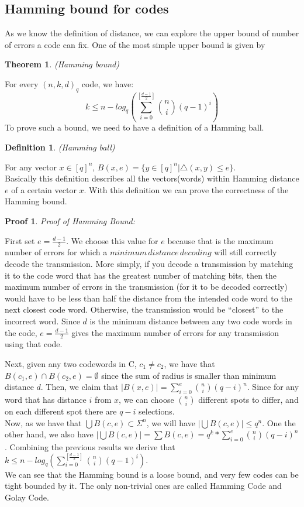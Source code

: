 \documentclass{article}
\newtheorem{Definition}{Definition}
\newtheorem{Theorem}{Theorem}
\newtheorem{Proof}{Proof}
\begin{document}
\subsection{Hamming bound for codes}
As we know the definition of distance, we can explore the upper bound of number of errors a code can fix. One of the most simple upper bound is given by
\begin{Theorem}(Hamming bound)\end{Theorem}
\noindent For every $(n,k,d)_{q}$ code, we have:
\begin{equation}
k \le n - log_q(\sum_{i=0}^{[\frac{d-1}{2}]}{n \choose i} (q-1)^i)
\end{equation}
To prove such a bound, we need to have a definition of a Hamming ball.
\begin{Definition}(Hamming ball)\end{Definition}
\noindent For any vector $x \in [q]^n$,
$B(x,e) = \{y \in [q]^n | \bigtriangleup (x,y) \le e\}$.\\
Basically this definition describes all the vectors(words) within Hamming distance $e$ of a certain vector $x$. With this definition we can prove the correctness of the Hamming bound.
\begin{Proof}Proof of Hamming Bound: \end{Proof} 
\noindent First set $e = \frac{d-1}{2}$. We choose this value for $e$ because that is the maximum number of errors for which a $minimum\, distance\, decoding$ will still correctly decode the transmission. More simply, if you decode a transmission by matching it to the code word that has the greatest number of matching bits, then the maximum number of errors in the transmission (for it to be decoded correctly) would have to be less than half the distance from the intended code word to the next closest code word. Otherwise, the transmission would be ``closest'' to the incorrect word. Since $d$ is the minimum distance between any two code words in the code,  $e = \frac{d-1}{2}$ gives the maximum number of errors for any transmission using that code. 

 Next, given any two codewords in C, $c_1 \neq c_2$, we have that $B(c_1,e) \cap B(c_2,e) = \emptyset$ since the sum of radius is smaller than minimum distance $d$. Then, we claim that $|B(x,e)| = \sum_{i=0}^{e} {n \choose i}(q-i)^n$. Since for any word that has distance $i$ from $x$, we can choose ${n \choose i}$ different spots to differ, and on each different spot there are $q-i$ selections.\\
Now, as we have that $\bigcup B(c,e) \subset \Sigma^n$, we will have $|\bigcup B(c,e)| \le q^n$. One the other hand, we also have $|\bigcup B(c,e)| = \sum B(c,e) = q^k* \sum_{i=0}^{e} {n \choose i}(q-i)^n$. Combining the previous results we derive that $k \le n - log_q(\sum_{i=0}^{[\frac{d-1}{2}]}{n \choose i} (q-1)^i)$.\\
We can see that the Hamming bound is a loose bound, and very few codes can be tight bounded by it. The only non-trivial ones are called Hamming Code and Golay Code.\\
\end{document}
